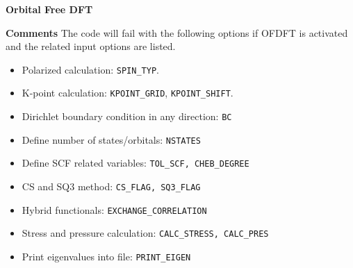 
\begin{frame}[allowframebreaks,c]{} \label{OFDFT}

\begin{center}
\Huge \textbf{Orbital Free DFT}
\end{center}

\end{frame}

\begin{frame}[allowframebreaks]{\textbf{Comments}} \label{OFDFT_COMMENTS}
The code will fail with the following options if OFDFT is activated and the related input options are listed.
\begin{itemize}
  \item Polarized calculation: \texttt{SPIN\_TYP}.
  \item K-point calculation: \texttt{KPOINT\_GRID}, \texttt{KPOINT\_SHIFT}.
  \item Dirichlet boundary condition in any direction: \texttt{BC}
  \item Define number of states/orbitals: \texttt{NSTATES}
  \item Define SCF related variables: \texttt{TOL\_SCF, CHEB\_DEGREE}
  \item CS and SQ3 method: \texttt{CS\_FLAG, SQ3\_FLAG}
  \item Hybrid functionals: \texttt{EXCHANGE\_CORRELATION}
  \item Stress and pressure calculation: \texttt{CALC\_STRESS, CALC\_PRES}
  \item Print eigenvalues into file: \texttt{PRINT\_EIGEN}
\end{itemize}

\end{frame}

